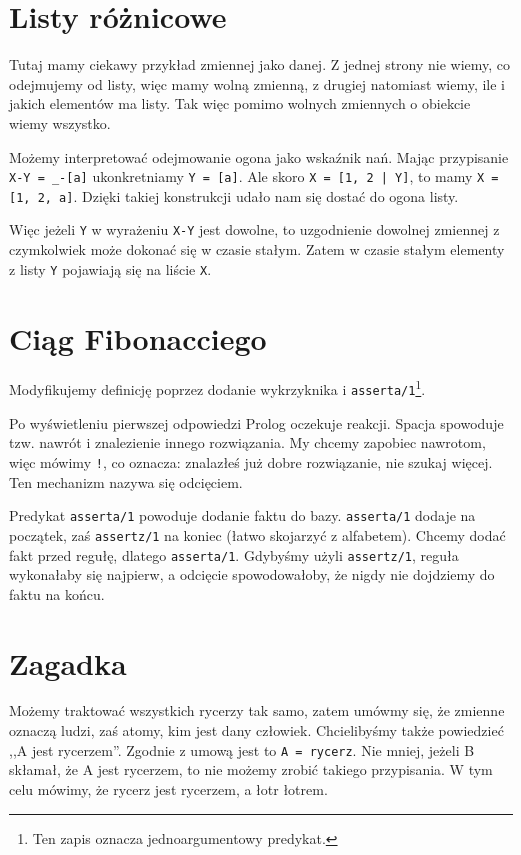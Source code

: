 \documentclass[12pt,a4paper]{article}
\begin{document}
\section{Listy różnicowe}
Tutaj mamy ciekawy przykład zmiennej jako danej. Z jednej strony nie wiemy, co odejmujemy od listy, więc mamy wolną zmienną, z drugiej natomiast wiemy, ile i jakich elementów ma listy. Tak więc pomimo wolnych zmiennych o obiekcie wiemy wszystko.

Możemy interpretować odejmowanie ogona jako wskaźnik nań. Mając przypisanie \verb+X-Y = _-[a]+ ukonkretniamy \verb+Y = [a]+. Ale skoro \verb+X = [1, 2 | Y]+, to mamy \verb+X = [1, 2, a]+. Dzięki takiej konstrukcji udało nam się dostać do ogona listy.

Więc jeżeli \verb+Y+ w wyrażeniu \verb+X-Y+ jest dowolne, to uzgodnienie dowolnej zmiennej z czymkolwiek może dokonać się w czasie stałym. Zatem w czasie stałym elementy z listy \verb+Y+ pojawiają się na liście \verb+X+.

\section{Ciąg Fibonacciego}
Modyfikujemy definicję poprzez dodanie wykrzyknika i \verb+asserta/1+\footnote{Ten zapis oznacza jednoargumentowy predykat.}.

Po wyświetleniu pierwszej odpowiedzi Prolog oczekuje reakcji. Spacja spowoduje tzw. nawrót i znalezienie innego rozwiązania. My chcemy zapobiec nawrotom, więc mówimy \verb+!+, co oznacza: znalazłeś już dobre rozwiązanie, nie szukaj więcej. Ten mechanizm nazywa się odcięciem.

Predykat \verb+asserta/1+ powoduje dodanie faktu do bazy. \verb+asserta/1+ dodaje na początek, zaś \verb+assertz/1+ na koniec (łatwo skojarzyć z alfabetem). Chcemy dodać fakt przed regułę, dlatego \verb+asserta/1+. Gdybyśmy użyli \verb+assertz/1+, reguła wykonałaby się najpierw, a odcięcie spowodowałoby, że nigdy nie dojdziemy do faktu na końcu.

\section{Zagadka}
Możemy traktować wszystkich rycerzy tak samo, zatem umówmy się, że zmienne oznaczą ludzi, zaś atomy, kim jest dany człowiek. Chcielibyśmy także powiedzieć ,,A jest rycerzem''. Zgodnie z umową jest to \verb+A = rycerz+. Nie mniej, jeżeli B skłamał, że A jest rycerzem, to nie możemy zrobić takiego przypisania. W tym celu mówimy, że rycerz jest rycerzem, a łotr łotrem.
\end{document}
